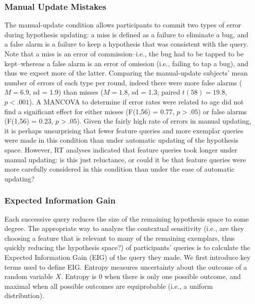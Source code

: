 \documentclass[10pt,letterpaper]{article}
\begin{document}
\subsubsection{Manual Update Mistakes}

The manual-update condition allows participants to commit two types of error during hypothesis updating: a miss is defined as a failure to eliminate a bug, and a false alarm is a failure to keep a hypothesis that was consistent with the query. Note that a miss is an error of commission--i.e., the bug had to be tapped to be kept--whereas a false alarm is an error of omission (i.e., failing to tap a bug), and thus we expect more of the latter. Comparing the manual-update subjects' mean number of errors of each type per round, indeed there were more false alarms ($M=6.9$, sd = 1.9) than misses ($M=1.8$, sd = 1.3; paired $t(58) = 19.8$, $p<.001$). A MANCOVA to determine if error rates were related to age did not find a significant effect for either misses (F(1,56) = 0.77, $p>.05$) or false alarms (F(1,56) = 0.23, $p>.05$). Given the fairly high rate of errors in manual updating, it is perhaps unsurprising that fewer feature queries and more exemplar queries were made in this condition than under automatic updating of the hypothesis space. However, RT analyses indicated that feature queries took longer under manual updating: is this just reluctance, or could it be that feature queries were more carefully considered in this condition than under the ease of automatic updating? 

\subsubsection{Expected Information Gain}

Each successive query reduces the size of the remaining hypothesis space to some degree. The appropriate way to analyze the contextual sensitivity (i.e., are they choosing a feature that is relevant to many of the remaining exemplars, thus quickly reducing the hypothesis space?) of participants' queries is to calculate the Expected Information Gain (EIG) of the query they made. We first introduce key terms used to define EIG. Entropy measures uncertainty about the outcome of a random variable $X$. Entropy is 0 when there is only one possible outcome, and maximal when all possible outcomes are equiprobable (i.e., a uniform distribution).
\end{document}
